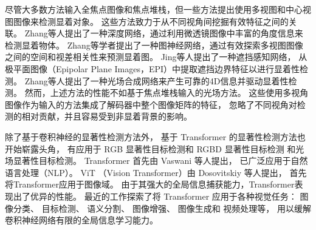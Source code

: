 



尽管大多数方法输入全焦点图像和焦点堆栈，但一些方法提出使用多视图和中心视图图像来检测显着对象。 
这些方法致力于从不同视角间挖掘有效特征之间的关联。
Zhang等人提出了一种深度网络，通过利用微透镜图像中丰富的角度信息来检测显着物体。 
Zhang等学者提出了一种图神经网络，通过有效探索多视图图像之间的空间和视差相关性来预测显着图。 
Jing等人提出了一种遮挡感知网络，
从极平面图像（Epipolar Plane Images，EPI）中提取遮挡边界特征以进行显着性检测。 
Zhang等人提出了一种光场合成网络来产生可靠的4D信息并驱动显着性检测。 
然而，上述方法的性能不如基于焦点堆栈输入的光场方法。 
这些使用多视角图像作为输入的方法集成了解码器中整个图像矩阵的特征，
忽略了不同视角对检测的相对贡献，并且容易受到非显着背景的影响。 




除了基于卷积神经的显著性检测方法外，
基于 Transformer 的显著性检测方法也开始崭露头角，
有应用于 
RGB 显著性目标检测和 
RGBD 显著性目标检测
和光场显著性目标检测。
Transformer 首先由 Vaswani 等人提出，
已广泛应用于自然语言处理（NLP）。
ViT （Vision Transformer）由 Dosovitskiy 等人提出，
首先将Transformer应用于图像域。
由于其强大的全局信息捕获能力，Transformer表现出了优异的性能。
最近的工作探索了将 Transformer 应用于各种视觉任务：
图像分类、
目标检测、
语义分割、
图像增强、
图像生成和 
视频处理等，
用以缓解卷积神经网络有限的全局信息学习能力。



